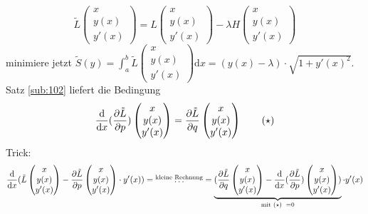 \[
	\tilde L \begin{pmatrix}
		x \\ y(x) \\ y'(x)
	\end{pmatrix} = L \begin{pmatrix}
		x \\ y(x) \\ y'(x)
	\end{pmatrix} - \lambda  H \begin{pmatrix}
		x \\ y(x) \\ y'(x)
	\end{pmatrix}
\]
minimiere jetzt $\tilde S (y) = \int_{a} ^{b} \! \tilde L \begin{pmatrix}
		x \\ y(x) \\ y'(x)
	\end{pmatrix}  \mathrm{d}x  = (y(x) - \lambda ) \cdot  \sqrt{1+ y'(x)^2}  $. Satz \ref{sub:102} liefert die Bedingung 
\[
	\frac{\mathrm{d} }{\mathrm{d} x}  (\frac{{\partial \tilde L}}{{\partial p}}  )  \begin{pmatrix}
		x \\ y(x) \\ y'(x)
	\end{pmatrix} = \frac{{\partial \tilde L}}{{\partial q}}  \begin{pmatrix}
		x \\ y(x) \\ y'(x)
	\end{pmatrix} \tag{$\star$} 
\]
Trick: 
\[
	 \frac{\mathrm{d} }{\mathrm{d} x}  (\tilde L \begin{pmatrix}
		x \\ y(x) \\ y'(x)
	\end{pmatrix} - \frac{{\partial \tilde L}}{{\partial p}}  \begin{pmatrix}
		x \\ y(x) \\ y'(x)
	\end{pmatrix} \cdot y'(x)) = \overset{\text{kleine Rechnung}}{\ldots } = \underbrace{(\frac{{\partial \tilde L}}{{\partial q}}  \begin{pmatrix}
		x \\ y(x) \\ y'(x)
	\end{pmatrix} - \frac{\mathrm{d} }{\mathrm{d} x}  (\frac{{\partial \tilde L}}{{\partial p}}  ) \begin{pmatrix}
		x \\ y(x) \\ y'(x)
	\end{pmatrix})}_{\text{mit }(\star) \enspace=0} \cdot y'(x)  
\]
